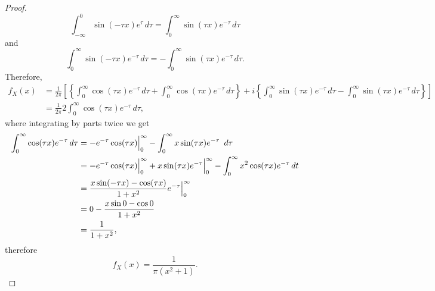 \documentclass[letterpaper, 10 pt, conference]{article}
\begin{document}
\begin{proof}
\begin{equation}
 	\int_{-\infty}^{0} \sin(-\tau x) e^{\tau} \, d\tau = \int_{0}^{\infty} \sin(\tau x) e^{-\tau} \, d\tau
 \end{equation}
 and
  \begin{equation}
 \int_{0}^{\infty} \sin(-\tau x) e^{-\tau} \, d\tau =  -\int_{0}^{\infty} \sin(\tau x) e^{-\tau} \, d\tau. 
 \end{equation}
 Therefore,
 \begin{align}
 	f_X (x) &= \frac{1}{2 \pi} \left\lbrack \left\lbrace   \int_{0}^{\infty} \cos (\tau x) e^{-\tau} \, d\tau +  \int_{0}^{\infty} \cos (\tau x) e^{-\tau} \, d\tau \right\rbrace + i \left\lbrace  \int_{0}^{\infty} \sin(\tau x) e^{-\tau} \, d\tau -  \int_{0}^{\infty} \sin(\tau x) e^{-\tau} \, d\tau \right\rbrace \right\rbrack\\
 	&= \frac{1}{2 \pi} 2  \int_{0}^{\infty} \cos (\tau x) e^{-\tau} \, d\tau,
 \end{align}
 where integrating by parts twice we get
 \begin{align}
 	 \int_{0}^{\infty} \cos (\tau x) e^{-\tau} \, d\tau &= -e^{-\tau} \cos (\tau x)\Big{\lvert}^{\infty}_{0} - \int_{0}^{\infty} x \sin (\tau x) e^{-\tau} \, d\tau \\
 	 &= -e^{-\tau} \cos (\tau x)\Big{\lvert}^{\infty}_{0} + x \sin (\tau x) e^{-\tau}\Big{\lvert}^{\infty}_{0} - \int_{0}^{\infty} x^2 \cos(\tau x) e^{-\tau} \, dt\\
 	 &= \frac{x \sin(-\tau x) - \cos (\tau x)}{1 + x^2} e^{-\tau} \Big{\lvert}^{\infty}_{0} \\
 	 &= 0 - \frac{x \sin 0 - \cos 0}{1 + x^2}\\
 	 &= \frac{1}{1+x^2},
 \end{align}
 therefore
 \begin{equation}
 	f_X (x) = \frac{1}{\pi (x^2 + 1)}.
 \end{equation}
\end{proof}
\end{document}
